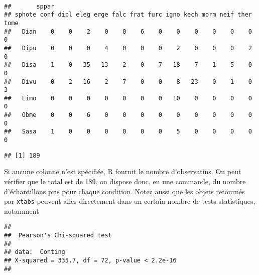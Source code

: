 \begin{knitrout}
\color{fgcolor}\begin{kframe}
\begin{flushleft}
\ttfamily\noindent
{}\hlassignement{\usebox{\hlnormalsizeboxlessthan}-}{\ }\hlkeyword{(}\hlkeyword{\urltilda{}}\hlkeyword{+}{\ }\hlkeyword{,}{\ }\hlkeyword{)}\hspace*{\fill}\\
\hlstd{}\mbox{}
\normalfont
\end{flushleft}
\begin{verbatim}
##       sppar
## sphote conf dipl eleg erge falc frat furc igno kech morm neif ther tome
##   Dian    0    0    2    0    0    6    0    0    0    0    0    0    0
##   Dipu    0    0    0    4    0    0    0    2    0    0    0    2    0
##   Disa    1    0   35   13    2    0    7   18    7    1    5    0    0
##   Divu    0    2   16    2    7    0    0    8   23    0    1    0    3
##   Limo    0    0    0    0    0    0    0   10    0    0    0    0    0
##   Obme    0    0    6    0    0    0    0    0    0    0    0    0    0
##   Sasa    1    0    0    0    0    0    0    5    0    0    0    0    0
\end{verbatim}
\begin{flushleft}
\ttfamily\noindent
{}\hlkeyword{(}\hlkeyword{)}\mbox{}
\normalfont
\end{flushleft}
\begin{verbatim}
## [1] 189
\end{verbatim}
\end{kframe}
\end{knitrout}


Si aucune colonne n'est spécifiée, R fournit le nombre d'observatins. On peut vérifier que le total est de 189, on dispose donc, en une commande, du nombre d'échantillons pris pour chaque condition. Notez aussi que les objets retournés par \texttt{xtabs} peuvent aller directement dans un certain nombre de tests statistiques, notamment

\begin{knitrout}
\color{fgcolor}\begin{kframe}
\begin{flushleft}
\ttfamily\noindent
{}\hlkeyword{(}\hlkeyword{)}\mbox{}
\normalfont
\end{flushleft}
\begin{verbatim}
## 
## 	Pearson's Chi-squared test
## 
## data:  Conting 
## X-squared = 335.7, df = 72, p-value < 2.2e-16
## 
\end{verbatim}
\end{kframe}
\end{knitrout}


